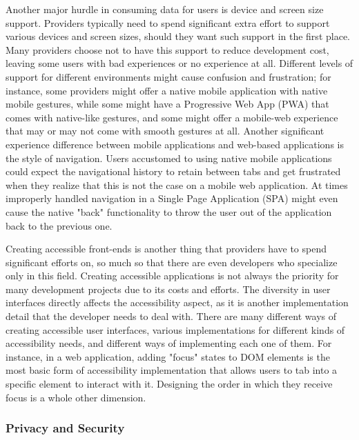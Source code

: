 Another major hurdle in consuming data for users is device and screen size support. Providers typically need to spend significant extra effort to support various devices and screen sizes, should they want such support in the first place. Many providers choose not to have this support to reduce development cost, leaving some users with bad experiences or no experience at all. Different levels of support for different environments might cause confusion and frustration; for instance, some providers might offer a native mobile application with native mobile gestures, while some might have a Progressive Web App (PWA) that comes with native-like gestures, and some might offer a mobile-web experience that may or may not come with smooth gestures at all. Another significant experience difference between mobile applications and web-based applications is the style of navigation. Users accustomed to using native mobile applications could expect the navigational history to retain between tabs and get frustrated when they realize that this is not the case on a mobile web application. At times improperly handled navigation in a Single Page Application (SPA) might even cause the native "back" functionality to throw the user out of the application back to the previous one.

Creating accessible front-ends is another thing that providers have to spend significant efforts on, so much so that there are even developers who specialize only in this field. Creating accessible applications is not always the priority for many development projects due to its costs and efforts. The diversity in user interfaces directly affects the accessibility aspect, as it is another implementation detail that the developer needs to deal with. There are many different ways of creating accessible user interfaces, various implementations for different kinds of accessibility needs, and different ways of implementing each one of them. For instance, in a web application, adding "focus" states to DOM elements is the most basic form of accessibility implementation that allows users to tab into a specific element to interact with it. Designing the order in which they receive focus is a whole other dimension. 

\subsubsection{Privacy and Security}

